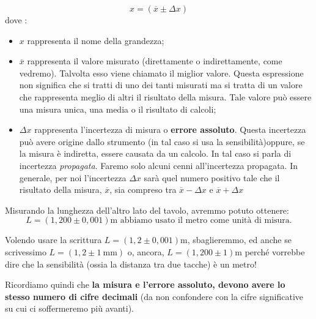 \[
x=\left( \overline{x} \pm \Delta x\right)
\]
dove :
\begin{itemize}
\item $x$ rappresenta il nome della grandezza;
\item $\overline{x}$ rappresenta il valore misurato (direttamente o indirettamente, come vedremo). Talvolta esso viene chiamato il miglior valore. Questa espressione non significa che si tratti di uno dei tanti misurati ma si tratta di un valore che rappresenta meglio di altri il risultato della misura. Tale valore può essere una misura unica, una media o il risultato di calcoli;
\item $\Delta x$ rappresenta l'incertezza di misura o \textbf{errore assoluto}. Questa incertezza può avere origine dallo strumento (in tal caso si usa la sensibilità)oppure, se la misura è indiretta, essere causata da un calcolo. In tal caso si parla di incertezza \textit{propagata}. Faremo solo alcuni cenni all'incertezza propagata. In generale, per noi l'incertezza $\Delta x$ sarà quel numero positivo tale che il risultato della misura, $\overline{x}$, sia compreso tra $\overline{x} -\Delta x$ e  $\overline{x} +\Delta x$
\end{itemize}

Misurando la lunghezza dell'altro lato del tavolo, avremmo potuto ottenere:
\[
L=\left(1,200 \pm 0,001\right)\si{\meter}  \,\, \text{abbiamo usato il metro come unità di misura.}
\]

Volendo usare la scrittura $L=\left(1,2 \pm 0,001\right)\si{\meter}$, sbaglieremmo, ed anche se scrivessimo $L=\left(1,2 \pm \SI{1}{\milli\meter}\right)$ o, ancora, $L=\left(1,200 \pm 1\right)\si{\meter}$ perché vorrebbe dire che la sensibilità (ossia la distanza tra due tacche) è un metro!

Ricordiamo quindi che \textbf{la misura e l'errore assoluto, devono avere lo stesso numero di cifre decimali} (da non confondere con la cifre significative su cui ci soffermeremo più avanti).
